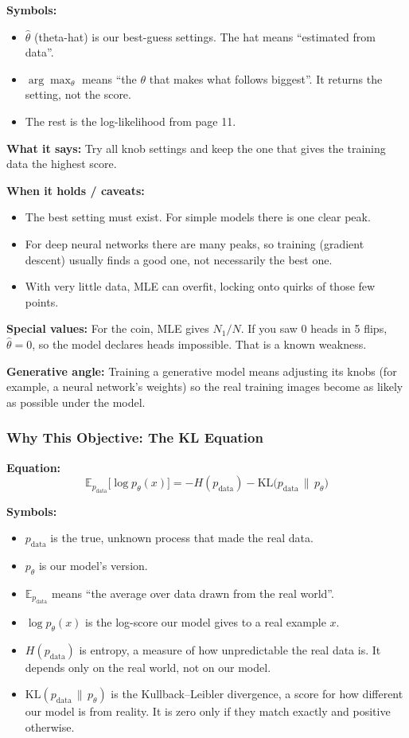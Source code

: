 \textbf{Symbols:}
\begin{itemize}
  \item $\hat{\theta}$ (theta-hat) is our best-guess settings. The hat means ``estimated from data''.
  \item $\arg\max_{\theta}$ means ``the $\theta$ that makes what follows biggest''. It returns the setting, not the score.
  \item The rest is the log-likelihood from page 11.
\end{itemize}

\textbf{What it says:} Try all knob settings and keep the one that gives the training data the highest score.

\textbf{When it holds / caveats:}
\begin{itemize}
  \item The best setting must exist. For simple models there is one clear peak.
  \item For deep neural networks there are many peaks, so training (gradient descent) usually finds a good one, not necessarily the best one.
  \item With very little data, MLE can overfit, locking onto quirks of those few points.
\end{itemize}

\textbf{Special values:} For the coin, MLE gives $N_1/N$. If you saw 0 heads in 5 flips, $\hat{\theta} = 0$, so the model declares heads impossible. That is a known weakness.

\textbf{Generative angle:} Training a generative model means adjusting its knobs (for example, a neural network's weights) so the real training images become as likely as possible under the model.

\subsubsection*{Why This Objective: The KL Equation}

\textbf{Equation:}
\[
\mathbb{E}_{p_{\mathrm{data}}}\bigl[\log p_{\theta}(x)\bigr] = -H(p_{\mathrm{data}}) - \mathrm{KL}\bigl(p_{\mathrm{data}} \,\|\, p_{\theta}\bigr)
\]

\textbf{Symbols:}
\begin{itemize}
  \item $p_{\mathrm{data}}$ is the true, unknown process that made the real data.
  \item $p_{\theta}$ is our model's version.
  \item $\mathbb{E}_{p_{\mathrm{data}}}$ means ``the average over data drawn from the real world''.
  \item $\log p_{\theta}(x)$ is the log-score our model gives to a real example $x$.
  \item $H(p_{\mathrm{data}})$ is entropy, a measure of how unpredictable the real data is. It depends only on the real world, not on our model.
  \item $\mathrm{KL}(p_{\mathrm{data}} \,\|\, p_{\theta})$ is the Kullback--Leibler divergence, a score for how different our model is from reality. It is zero only if they match exactly and positive otherwise.
\end{itemize}

